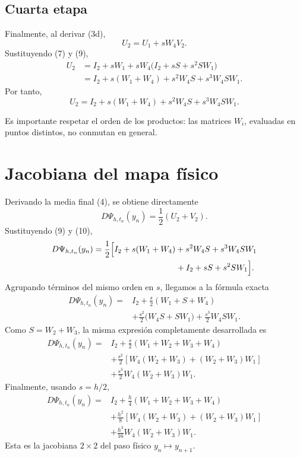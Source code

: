\documentclass[11pt,a4paper]{article}
\newcommand{\Id}{I}
\begin{document}
\subsection{Cuarta etapa}

Finalmente, al derivar (3d),
\[
 U_2=U_1+sW_4V_2.
\]
Sustituyendo (7) y (9),
\begin{align*}
 U_2
 &=\Id_2+sW_1
   +sW_4\bigl(\Id_2+sS+s^2SW_1\bigr)\\
 &=\Id_2+s(W_1+W_4)
   +s^2W_4S+s^3W_4SW_1.
\end{align*}
Por tanto,
\[
 \boxed{
 U_2
 =\Id_2+s(W_1+W_4)
 +s^2W_4S+s^3W_4SW_1.}
 \tag{10}
\]

Es importante respetar el orden de los productos: las matrices \(W_i\), evaluadas
en puntos distintos, no conmutan en general.

\section{Jacobiana del mapa físico}

Derivando la media final (4), se obtiene directamente
\[
 D\Psi_{h,t_n}(y_n)
 =\frac12\left(U_2+V_2\right).
 \tag{11}
\]
Sustituyendo (9) y (10),
\begin{align*}
 D\Psi_{h,t_n}(y_n)
 &=\frac12\Bigl[
  \Id_2+s(W_1+W_4)+s^2W_4S+s^3W_4SW_1\\
 &\hspace{3.5cm}
  +\Id_2+sS+s^2SW_1
 \Bigr].
\end{align*}
Agrupando términos del mismo orden en \(s\), llegamos a la fórmula exacta
\[
 \boxed{
 \begin{aligned}
 D\Psi_{h,t_n}(y_n)
 ={}&\Id_2
 +\frac{s}{2}(W_1+S+W_4)\\
 &+\frac{s^2}{2}\bigl(W_4S+SW_1\bigr)
 +\frac{s^3}{2}W_4SW_1.
 \end{aligned}}
 \tag{12}
\]
Como \(S=W_2+W_3\), la misma expresión completamente desarrollada es
\[
 \boxed{
 \begin{aligned}
 D\Psi_{h,t_n}(y_n)
 ={}&\Id_2
 +\frac{s}{2}(W_1+W_2+W_3+W_4)\\
 &+\frac{s^2}{2}
 \left[W_4(W_2+W_3)+(W_2+W_3)W_1\right]\\
 &+\frac{s^3}{2}W_4(W_2+W_3)W_1.
 \end{aligned}}
 \tag{13}
\]
Finalmente, usando \(s=h/2\),
\[
 \boxed{
 \begin{aligned}
 D\Psi_{h,t_n}(y_n)
 ={}&\Id_2
 +\frac{h}{4}(W_1+W_2+W_3+W_4)\\
 &+\frac{h^2}{8}
 \left[W_4(W_2+W_3)+(W_2+W_3)W_1\right]\\
 &+\frac{h^3}{16}W_4(W_2+W_3)W_1.
 \end{aligned}}
 \tag{14}
\]
Esta es la jacobiana \(2\times2\) del paso físico
\(y_n\mapsto y_{n+1}\).
\end{document}
